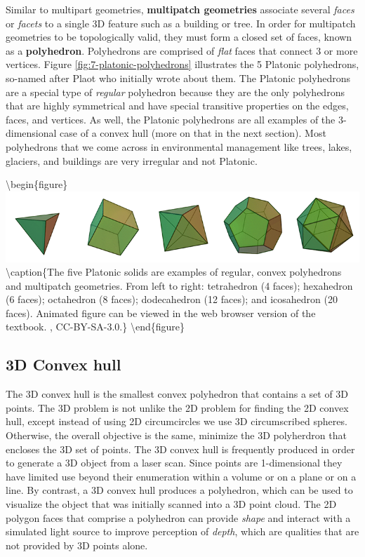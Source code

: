 \documentclass[
]{book}
\begin{document}
Similar to multipart geometries, \textbf{multipatch geometries} associate several \emph{faces} or \emph{facets} to a single 3D feature such as a building or tree. In order for multipatch geometries to be topologically valid, they must form a closed set of faces, known as a \textbf{polyhedron}. Polyhedrons are comprised of \emph{flat} faces that connect 3 or more vertices. Figure \ref{fig:7-platonic-polyhedrons} illustrates the 5 Platonic polyhedrons, so-named after Plaot who initially wrote about them. The Platonic polyhedrons are a special type of \emph{regular} polyhedron because they are the only polyhedrons that are highly symmetrical and have special transitive properties on the edges, faces, and vertices. As well, the Platonic polyhedrons are all examples of the 3-dimensional case of a convex hull (more on that in the next section). Most polyhedrons that we come across in environmental management like trees, lakes, glaciers, and buildings are very irregular and not Platonic.

\textbackslash begin\{figure\}
\includegraphics[width=0.75\linewidth]{images/07-platonic-polyhedrons} \textbackslash caption\{The five Platonic solids are examples of regular, convex polyhedrons and multipatch geometries. From left to right: tetrahedron (4 faces); hexahedron (6 faces); octahedron (8 faces); dodecahedron (12 faces); and icosahedron (20 faces). Animated figure can be viewed in the web browser version of the textbook. \citet{cyp_polyhedra_2005}, CC-BY-SA-3.0.\}\label{fig:7-platonic-polyhedrons}
\textbackslash end\{figure\}

\subsection{3D Convex hull}\label{d-convex-hull}

The 3D convex hull is the smallest convex polyhedron that contains a set of 3D points. The 3D problem is not unlike the 2D problem for finding the 2D convex hull, except instead of using 2D circumcircles we use 3D circumscribed spheres. Otherwise, the overall objective is the same, minimize the 3D polyherdron that encloses the 3D set of points. The 3D convex hull is frequently produced in order to generate a 3D object from a laser scan. Since points are 1-dimensional they have limited use beyond their enumeration within a volume or on a plane or on a line. By contrast, a 3D convex hull produces a polyhedron, which can be used to visualize the object that was initially scanned into a 3D point cloud. The 2D polygon faces that comprise a polyhedron can provide \emph{shape} and interact with a simulated light source to improve perception of \emph{depth}, which are qualities that are not provided by 3D points alone.
\end{document}
